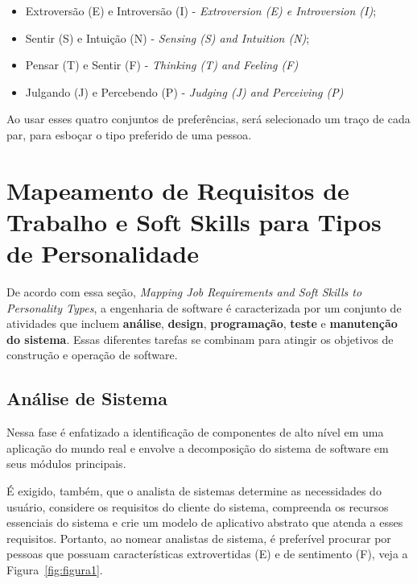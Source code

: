 \documentclass[12pt]{article}
\begin{document}
\begin{itemize}
    \item Extroversão (E) e Introversão (I) - \textit{Extroversion (E) e Introversion (I)};
    \item Sentir (S) e Intuição (N) - \textit{Sensing (S) and Intuition (N)};
	\item Pensar (T) e Sentir (F) - \textit{Thinking (T) and Feeling (F)}
	\item Julgando (J) e Percebendo (P) - \textit{Judging (J) and Perceiving (P)}
\end{itemize}

 Ao usar esses quatro conjuntos de preferências, será selecionado um traço de cada par, para esboçar o tipo preferido de uma pessoa. 


\section{Mapeamento de Requisitos de Trabalho e Soft Skills para Tipos de Personalidade}\label{sec:figs}

De acordo com essa seção, \textit{Mapping Job Requirements and Soft Skills to Personality Types}, a engenharia de software é caracterizada por um conjunto de atividades que incluem \textbf{análise}, \textbf{design}, \textbf{programação}, \textbf{teste} e \textbf{manutenção do sistema}. Essas diferentes tarefas se combinam para atingir os objetivos de construção e operação de software.

\subsection{Análise de Sistema}

Nessa fase é enfatizado a identificação de componentes de alto nível em uma aplicação do mundo real e envolve a decomposição do sistema de software em seus módulos principais. 

É exigido, também, que o analista de sistemas determine as necessidades do usuário, considere os requisitos do cliente do sistema, compreenda os recursos essenciais do sistema e crie um modelo de aplicativo abstrato que atenda a esses requisitos.  
Portanto, ao nomear analistas de sistema, é preferível procurar por pessoas que possuam características extrovertidas (E) e de sentimento (F), veja a Figura~\ref{fig:figura1}.
\end{document}
